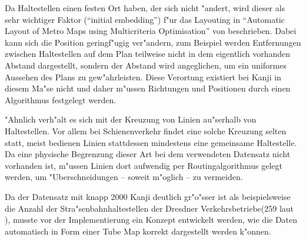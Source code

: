 Da Haltestellen einen festen Ort haben, der sich nicht "andert, wird dieser als sehr wichtiger Faktor ("`initial embedding"') f"ur das Layouting in "`Automatic Layout of Metro Maps using Multicriteria Optimisation"' von \cite{automaticlayoutmetro08} beschrieben. Dabei kann sich die Position geringf"ugig ver"andern, zum Beispiel werden Entfernungen zwischen Haltestellen auf dem Plan teilweise nicht in dem eigentlich vorhanden Abstand dargestellt, sondern der Abstand wird angeglichen, um ein uniformes Aussehen des Plans zu gew"ahrleisten. Diese Verortung existiert bei Kanji in diesem Ma"se nicht und daher m"ussen Richtungen und Positionen durch einen Algorithmus festgelegt werden. 

"Ahnlich verh"alt es sich mit der Kreuzung von Linien au"serhalb von Haltestellen. Vor allem bei Schienenverkehr findet eine solche Kreuzung selten statt, meist bedienen Linien stattdessen mindestens eine gemeinsame Haltestelle. Da eine physische Begrenzung dieser Art bei dem verwendeten Datensatz nicht vorhanden ist, m"ussen Linien dort aufwendig per Routingalgorithmus gelegt werden, um "Uberschneidungen – soweit m"oglich – zu vermeiden.

Da der Datensatz mit knapp 2000 Kanji deutlich gr"o"sser ist als beispielsweise die Anzahl der Stra"senbahnhaltestellen der Dresdner Verkehrsbetriebe(259 laut \cite{dvbag}), musste vor der Implementierung ein Konzept entwickelt werden, wie die Daten automatisch in Form einer Tube Map korrekt dargestellt werden k"onnen.

